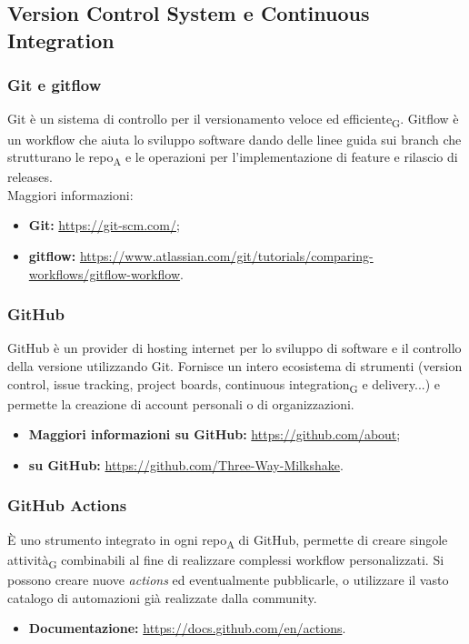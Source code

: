 \subsection{Version Control System e Continuous Integration}

\subsubsection{Git e gitflow}
Git è un sistema di controllo per il versionamento veloce ed efficiente\textsubscript{G}. Gitflow è un workflow che aiuta lo sviluppo software dando delle linee guida sui branch che strutturano le repo\textsubscript{A} e le operazioni per l'implementazione di feature e rilascio di releases.\\
Maggiori informazioni:
\begin{itemize}
    \item \textbf{Git: }\url{https://git-scm.com/};
    \item \textbf{gitflow: }\url{https://www.atlassian.com/git/tutorials/comparing-workflows/gitflow-workflow}.
\end{itemize}

\subsubsection{GitHub}
GitHub è un provider di hosting internet per lo sviluppo di software e il controllo della versione utilizzando Git. Fornisce un intero ecosistema di strumenti (version control, issue tracking, project boards, continuous integration\textsubscript{G} e delivery...) e permette la creazione di account personali o di organizzazioni.
\begin{itemize}
    \item \textbf{Maggiori informazioni su GitHub:} \url{https://github.com/about};
    \item \textbf{\group{} su GitHub: }\url{https://github.com/Three-Way-Milkshake}.
\end{itemize}

\subsubsection{GitHub Actions}
È uno strumento integrato in ogni repo\textsubscript{A} di GitHub, permette di creare singole attività\textsubscript{G} combinabili al fine di realizzare complessi workflow personalizzati. 
Si possono creare nuove \textit{actions} ed eventualmente pubblicarle, o utilizzare il vasto catalogo di automazioni già realizzate dalla community.
\begin{itemize}
    \item \textbf{Documentazione: } \url{https://docs.github.com/en/actions}.
\end{itemize}